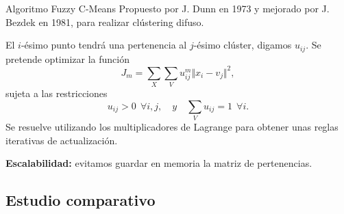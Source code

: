 \documentclass[10pt, spanish]{beamer}
\begin{document}
\begin{frame}{Algoritmo Fuzzy C-Means}
  Propuesto por J. Dunn en 1973 y mejorado por J. Bezdek en 1981, para realizar clústering difuso.

  El $i$-ésimo punto tendrá una pertenencia al $j$-ésimo clúster, digamos $u_{ij}$. Se pretende optimizar la función
  \[
    J_m = \sum_{X}\sum_{V} u_{ij}^m\Vert x_i - v_j \Vert^2,
  \]
  sujeta a las restricciones
  \[
    u_{ij}>0 \ \ \forall i, j, \quad y \quad \sum_{V}u_{ij} =1 \ \ \forall i.
  \]
  Se resuelve utilizando los multiplicadores de Lagrange para obtener unas reglas iterativas de actualización.

  \textbf{Escalabilidad:} evitamos guardar en memoria la matriz de pertenencias.
\end{frame}

\subsection{Estudio comparativo}
\end{document}
